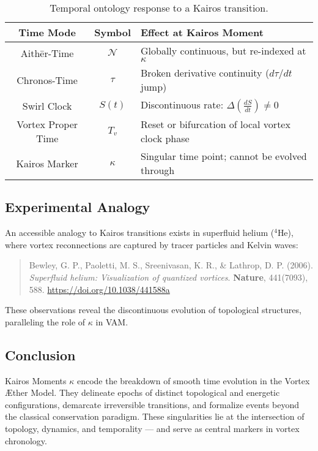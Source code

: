 \documentclass[12pt]{article}
\begin{document}
    \begin{table}[H]
        \centering
        \renewcommand{\arraystretch}{1.3}
        \begin{tabular}{|c|c|p{9cm}|}
            \hline
            \textbf{Time Mode} & \textbf{Symbol} & \textbf{Effect at Kairos Moment} \\
            \hline
            Aithēr-Time & \( \mathcal{N} \) & Globally continuous, but re-indexed at \(\kappa\) \\
            Chronos-Time & \( \tau \) & Broken derivative continuity (\( d\tau/dt \) jump) \\
            Swirl Clock & \( S(t) \) & Discontinuous rate: \( \Delta \left(\frac{dS}{dt}\right) \neq 0 \) \\
            Vortex Proper Time & \( T_v \) & Reset or bifurcation of local vortex clock phase \\
            Kairos Marker & \( \kappa \) & Singular time point; cannot be evolved through \\
            \hline
        \end{tabular}
        \caption{Temporal ontology response to a Kairos transition.}
    \end{table}


    \subsection*{Experimental Analogy}
    An accessible analogy to Kairos transitions exists in superfluid helium (\(^4\)He), where vortex reconnections are captured by tracer particles and Kelvin waves:
    \begin{quote}
        Bewley, G. P., Paoletti, M. S., Sreenivasan, K. R., \& Lathrop, D. P. (2006). \textit{Superfluid helium: Visualization of quantized vortices}. \textbf{Nature}, 441(7093), 588. \url{https://doi.org/10.1038/441588a}
    \end{quote}
    These observations reveal the discontinuous evolution of topological structures, paralleling the role of \( \kappa \) in VAM.

    \subsection*{Conclusion}
    Kairos Moments \( \kappa \) encode the breakdown of smooth time evolution in the Vortex Æther Model. They delineate epochs of distinct topological and energetic configurations, demarcate irreversible transitions, and formalize events beyond the classical conservation paradigm. These singularities lie at the intersection of topology, dynamics, and temporality — and serve as central markers in vortex chronology.






    \ifdefined\standalonechapter
    \else
    
    
    
\end{document}
